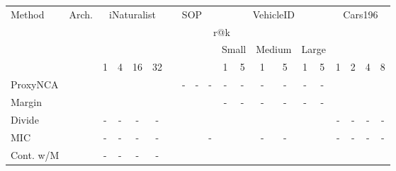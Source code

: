 \begin{table*}[t]
\begin{center}
\footnotesize
\setlength{\tabcolsep}{1.5pt}
    \setlength\extrarowheight{-2pt}
    \begin{tabular}{@{\zsp}l@{\xssp}l@{\xssp}|cccc|cccc|cc|cc|cc|cccc}
    \hline
    \multirow{3}[1]{*}{Method}& \multirow{3}[1]{*}{Arch.} & \multicolumn{4}{c|}{iNaturalist \cite{vms+18}} & \multicolumn{4}{c|}{SOP \cite{ohb16}} & \multicolumn{6}{c|}{VehicleID \cite{ltw+16}} & \multicolumn{4}{c}{Cars196 \cite{ksd+13}}\\
    \cline{3-20}
    & & \multicolumn{15}{c}{r@k}\\ \cline{3-20}
    & & & & & & & & & & \multicolumn{2}{c|}{Small} & \multicolumn{2}{c|}{Medium} & \multicolumn{2}{c|}{Large} & & & & \\
    & & 1 & 4 & 16 & 32 &  &  &  &  & 1 & 5 & 1 & 5 & 1 & 5 & 1 & 2 & 4 & 8\\
    \hline \hline
    
	ProxyNCA \cite{mtl+17} & {\scriptsize} &
	 & 
	 & 
	 & 
	 &

	 & 
	- & 
	- & 
	- &
	
	- &
	- &
	- &
	- &
	- &
	- &
	
	 &
	 &
	 &
	
	\\
	
	Margin \cite{wms+17} & {\scriptsize} &
	 & 
	 & 
	 & 
	 &

	 &
	 & 
	 & 
	 &
	
	- &
	- &
	- &
	- &
	- &
	- &
	
	 &
	 &
	 &
	
	\\
	
	Divide \cite{skp+15} & {\scriptsize} &
	- &
	- &
	- &
	- &
	
	 & 
	 & 
	 &
	 &

     &
     &
     &
     &
     &
     &
    
    - &
    - &
    - &
    -
	\\
	
	MIC \cite{rbo+19} & {\scriptsize} &
	- &
	- &
	- &
	- &

	 &
	 &
	 &
	-  &

     &
     &
    - &
    - &
     &
     &
    
    - &
    - &
    - &
    -

	\\
	
	Cont. w/M \cite{wzh+20} & {\scriptsize} &
	- &
	- &
	- &
	- &
	

\end{tabular}
\end{center}
\end{table*}
